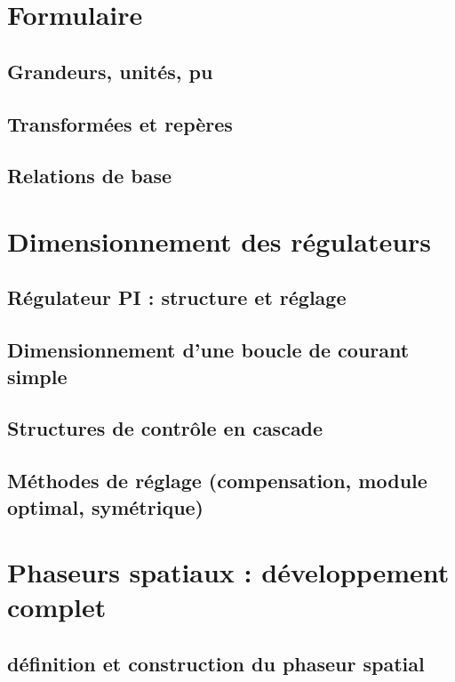 \chapter{Formulaire}

\section{Grandeurs, unités, pu}

\section{Transformées et repères}

\section{Relations de base}

\chapter{Dimensionnement des régulateurs}

\section{Régulateur PI : structure et réglage}

\section{Dimensionnement d'une boucle de courant simple}

\section{Structures de contrôle en cascade}

\section{Méthodes de réglage (compensation, module optimal, symétrique)}

\chapter{Phaseurs spatiaux : développement complet}

\section{définition et construction du phaseur spatial}

